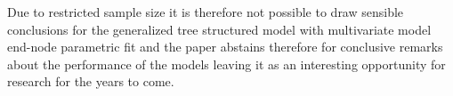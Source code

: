 Due to restricted sample size it is therefore not possible to draw
sensible conclusions for the generalized tree structured model with
multivariate model end-node parametric fit and the paper abstains
therefore for conclusive remarks about the performance of the models
leaving it as an interesting opportunity for research for the years to
come.






